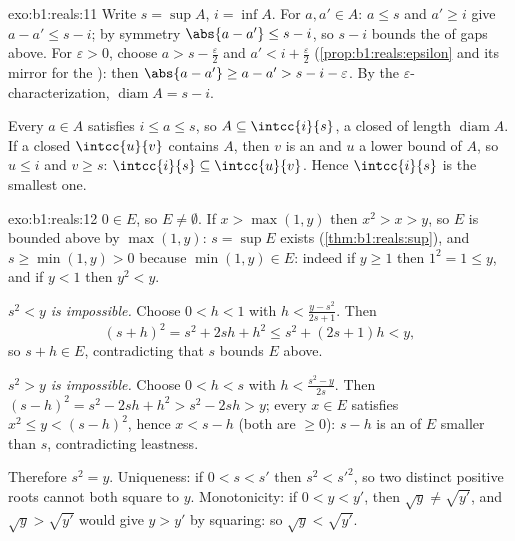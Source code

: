 \begin{solution}{exo:b1:reals:11}
Write $s = \sup A$, $i = \inf A$. For $a, a' \in A$: $a \leq s$
and $a' \geq i$ give $a - a' \leq s - i$; by symmetry $\abs{a -
a'} \leq s - i$, so $s - i$ bounds the  of gaps above. For
$\varepsilon > 0$, choose $a > s - \frac\varepsilon2$ and $a' < i
+ \frac\varepsilon2$ (\cref{prop:b1:reals:epsilon} and its mirror
for the ): then $\abs{a - a'} \geq a - a' > s - i -
\varepsilon$. By the $\varepsilon$-characterization,
$\operatorname{diam} A = s - i$.

Every $a \in A$ satisfies $i \leq a \leq s$, so $A \subseteq
\intcc{i}{s}$, a closed  of length $\operatorname{diam}
A$. If a closed  $\intcc{u}{v}$ contains $A$, then $v$ is
an  and $u$ a lower bound of $A$, so $u \leq i$ and $v
\geq s$: $\intcc{i}{s} \subseteq \intcc{u}{v}$. Hence
$\intcc{i}{s}$ is the smallest one.
\end{solution}

\begin{solution}{exo:b1:reals:12}
$0 \in E$, so $E \neq \emptyset$. If $x > \max(1, y)$ then $x^2 >
x > y$, so $E$ is bounded above by $\max(1, y)$: $s = \sup E$
exists (\cref{thm:b1:reals:sup}), and $s \geq \min(1, y) > 0$
because $\min(1, y) \in E$: indeed if $y \geq 1$ then $1^2 = 1
\leq y$, and if $y < 1$ then $y^2 < y$.

\emph{$s^2 < y$ is impossible.} Choose $0 < h < 1$ with $h <
\frac{y - s^2}{2s + 1}$. Then
\[
(s + h)^2 = s^2 + 2sh + h^2 \leq s^2 + (2s + 1)h < y ,
\]
so $s + h \in E$, contradicting that $s$ bounds $E$ above.

\emph{$s^2 > y$ is impossible.} Choose $0 < h < s$ with $h <
\frac{s^2 - y}{2s}$. Then $(s - h)^2 = s^2 - 2sh + h^2 > s^2 -
2sh > y$; every $x \in E$ satisfies $x^2 \leq y < (s - h)^2$,
hence $x < s - h$ (both are $\geq 0$): $s - h$ is an 
of $E$ smaller than $s$, contradicting leastness.

Therefore $s^2 = y$. Uniqueness: if $0 < s < s'$ then $s^2 <
s'^2$, so two distinct positive roots cannot both square to $y$.
Monotonicity: if $0 < y < y'$, then $\sqrt y \neq \sqrt{y'}$, and
$\sqrt y > \sqrt{y'}$ would give $y > y'$ by squaring: so $\sqrt
y < \sqrt{y'}$.
\end{solution}

